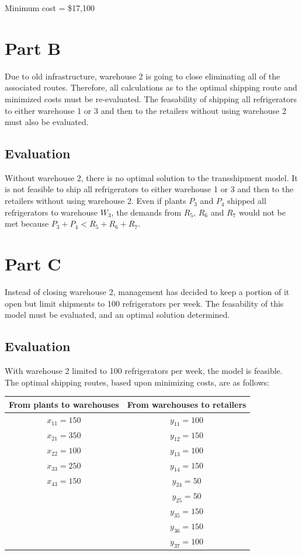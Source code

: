 \documentclass[11pt]{scrreprt}
\begin{document}
Minimum cost = \$17,100

\section{Part B}
Due to old infrastructure, warehouse 2 is going to close eliminating 
all of the associated routes. Therefore, all calculations as to the
optimal shipping route and minimized costs must be re-evaluated. The 
feasability of shipping all refrigerators to either warehouse 1 or 3
and then to the retailers without using warehouse 2 must also be
evaluated.

\subsection{Evaluation}
Without warehouse 2, there is no optimal solution to the transshipment 
model. It is not feasible to ship all refrigerators to either warehouse
1 or 3 and then to the retailers without using warehouse 2. Even if 
plants $P_3$ and $P_4$ shipped all refrigerators to warehouse $W_3$, 
the demands from $R_5$, $R_6$ and $R_7$ would not be met because
$P_3 + P_4 < R_5 + R_6 + R_7$.

\section{Part C}
Instead of closing warehouse 2, management has decided to keep a 
portion of it open but limit shipments to 100 refrigerators per week. 
The feasability of this model must be evaluated, and an optimal 
solution determined.

\subsection{Evaluation}
With warehouse 2 limited to 100 refrigerators per week, the model is
feasible. The optimal shipping routes, based upon minimizing costs, 
are as follows: \\

\begin{tabular}{|c|c|}
	\hline From plants to warehouses & From warehouses to retailers \\
	\hline $x_{11} = 150$ & $y_{11} = 100$ \\
	\hline $x_{21} = 350$ & $y_{12} = 150$ \\
	\hline $x_{22} = 100$ & $y_{13} = 100$  \\
	\hline $x_{33} = 250$ & $y_{14} = 150$  \\
	\hline $x_{43} = 150$ & $y_{24} = 50$  \\
	\hline 				  & $y_{25} = 50$ \\
	\hline 				  & $y_{35} = 150$ \\
	\hline 				  & $y_{36} = 150$ \\
	\hline 				  & $y_{37} = 100$ \\
	\hline
\end{tabular} \\
\end{document}
